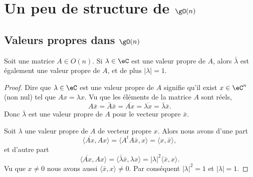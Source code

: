 
\section{Un peu de structure de \texorpdfstring{\( \gO(n)\)}{O(n)}}

\subsection{Valeurs propres dans \( \gO(n)\)}

\begin{proposition}      \label{PROPooVEJGooWnqtMm}
    Soit une matrice \( A\in O(n)\). Si \( \lambda\in \eC\) est une valeur propre de \( A\), alors \( \bar\lambda\) est également une valeur propre de \( A\), et de plus \( | \lambda |=1\).
\end{proposition}

\begin{proof}
    Dire que \( \lambda\in \eC\) est une valeur propre de \( A\) signifie qu'il exist \( x\in \eC^n\) (non nul) tel que \( Ax=\lambda x\). Vu que les éléments de la matrice \( A\) sont réels,
    \begin{equation}
        A\bar x=\bar A\bar x=\overline{ Ax }=\overline{ \lambda x }=\bar \lambda\bar x.
    \end{equation}
    Donc \( \bar \lambda\) est une valeur propre de \( A\) pour le vecteur propre \( \bar x\).

    Soit \( \lambda\)  une valeur propre de \( A\) de vecteur propre \( x\). Alors nous avons d'une part
    \begin{equation}
        \langle \overline{ Ax }, Ax\rangle =\langle A^tA\bar x, x\rangle =\langle x, \bar x\rangle ,
    \end{equation}
    et d'autre part
    \begin{equation}
        \langle \overline{ Ax }, Ax\rangle =\langle \bar \lambda \bar x, \lambda x\rangle =| \lambda |^2\langle \bar x, x\rangle .
    \end{equation}
    Vu que \( x\neq 0\) nous avons aussi \( \langle \bar x, x\rangle \neq 0\). Par conséquent \( | \lambda |^2=1\) et \( | \lambda |=1\).
\end{proof}

